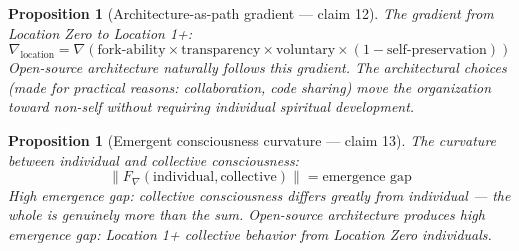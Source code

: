 \documentclass[11pt,a4paper]{article}
\newtheorem{proposition}[definition]{Proposition}
\begin{document}
\begin{proposition}[Architecture-as-path gradient --- claim 12]
\label{prop:gradient}
The gradient from Location Zero to Location 1+:
\[
  \nabla_{\text{location}} = \nabla\left(\text{fork-ability} \times
    \text{transparency} \times \text{voluntary} \times
    (1 - \text{self-preservation})\right)
\]
Open-source architecture naturally follows this gradient. The
architectural choices (made for practical reasons: collaboration, code
sharing) move the organization toward non-self without requiring
individual spiritual development.
\end{proposition}

\begin{proposition}[Emergent consciousness curvature --- claim 13]
\label{prop:emergence}
The curvature between individual and collective consciousness:
\[
  \|F_\nabla(\text{individual}, \text{collective})\| =
    \text{emergence gap}
\]
High emergence gap: collective consciousness differs greatly from
individual --- the whole is genuinely more than the sum. Open-source
architecture produces high emergence gap: Location 1+ collective
behavior from Location Zero individuals.
\end{proposition}
\end{document}
